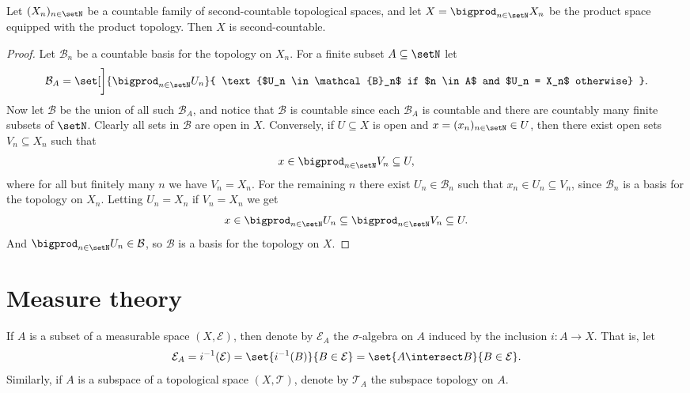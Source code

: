 \documentclass[article, a4paper, 11pt, oneside]{memoir}
\numberwithin{equation}{chapter}
\newcommand{\calT}{\mathcal{T}}
\newcommand{\calB}{\mathcal{B}}
\newcommand{\calE}{\mathcal{E}}
\begin{document}
\begin{proposition}
    \label{thm:second_countable_product}
    Let $(X_n)_{n \in \setN}$ be a countable family of second-countable topological spaces, and let $X = \bigprod_{n \in \setN} X_n$ be the product space equipped with the product topology. Then $X$ is second-countable.
\end{proposition}

\begin{proof}
    Let $\calB_n$ be a countable basis for the topology on $X_n$. For a finite subset $A \subseteq \setN$ let
    \begin{equation*}
        \calB_A = \set[\bigg]{ \bigprod_{n \in \setN} U_n }{ \text{$U_n \in \calB_n$ if $n \in A$ and $U_n = X_n$ otherwise} }.
    \end{equation*}
    Now let $\calB$ be the union of all such $\calB_A$, and notice that $\calB$ is countable since each $\calB_A$ is countable and there are countably many finite subsets of $\setN$. Clearly all sets in $\calB$ are open in $X$. Conversely, if $U \subseteq X$ is open and $x = (x_n)_{n \in \setN} \in U$, then there exist open sets $V_n \subseteq X_n$ such that
    \begin{equation*}
        x
            \in \bigprod_{n \in \setN} V_n
            \subseteq U,
    \end{equation*}
    where for all but finitely many $n$ we have $V_n = X_n$. For the remaining $n$ there exist $U_n \in \calB_n$ such that $x_n \in U_n \subseteq V_n$, since $\calB_n$ is a basis for the topology on $X_n$. Letting $U_n = X_n$ if $V_n = X_n$ we get
    \begin{equation*}
        x
            \in \bigprod_{n \in \setN} U_n
            \subseteq \bigprod_{n \in \setN} V_n
            \subseteq U.
    \end{equation*}
    And $\bigprod_{n \in \setN} U_n \in \calB$, so $\calB$ is a basis for the topology on $X$.
\end{proof}






\chapter{Measure theory}

If $A$ is a subset of a measurable space $(X, \calE)$, then denote by $\calE_A$ the $\sigma$-algebra on $A$ induced by the inclusion $i \colon A \to X$. That is, let
%
\begin{equation*}
    \calE_A
        = i^{-1}(\calE)
        = \set{i^{-1}(B)}{B \in \calE}
        = \set{A \intersect B}{B \in \calE}.
\end{equation*}
%
Similarly, if $A$ is a subspace of a topological space $(X, \calT)$, denote by $\calT_A$ the subspace topology on $A$.
\end{document}
